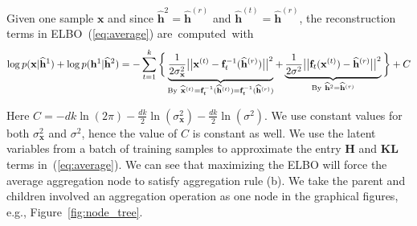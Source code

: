\documentclass{article} %
\begin{document}
Given one  sample $\mathbf{x}$ and since $\widehat{\mathbf{h}}^{2}= \widehat{\mathbf{h}}^{(r)}$ and $\widehat{\mathbf{h}}^{(t)}= \widehat{\mathbf{h}}^{(r)} $, the reconstruction terms in ELBO~(\ref{eq:average}) are~computed~with
\begin{align}\notag
\log p(\mathbf{x}|\widehat{\mathbf{h}}^1) + \log p(\mathbf{h}^1|\widehat{\mathbf{h}}^2) =-\sum_{t=1}^k\bigg\{ \underbrace{\frac{1}{2\sigma^2_{\mathbf{x}}}\big|\big| \mathbf{x}^{(t)} - \mathbf{f}_t^{-1}(\widehat{\mathbf{h}}^{(r)})\big|\big|^2 }_{\textrm{By} \  \widehat{\mathbf{x}}^{(t)}=\mathbf{f}_t^{-1}(\widehat{\mathbf{h}}^{(t)})=\mathbf{f}_t^{-1}(\widehat{\mathbf{h}}^{(r)})} +  \underbrace{\frac{1}{2\sigma^2}\big|\big|  \mathbf{f}_t(\mathbf{x}^{(t)}) - \widehat{\mathbf{h}}^{(r)}\big|\big|^2}_{\textrm{By} \  \widehat{\mathbf{h}}^{2}= \widehat{\mathbf{h}}^{(r)}} \bigg\} +C
\end{align} 

Here $C=-dk\ln(2\pi)-\frac{dk}{2}\ln(\sigma_{\mathbf{x}}^2)-\frac{dk}{2}\ln(\sigma^2)$. We use constant values for both  $\sigma^2_{\mathbf{x}}$ and $\sigma^2$, hence the value of $C$ is constant as well. We use the latent variables from a batch of training samples to approximate the entry \textbf{H} and \textbf{KL} terms in~(\ref{eq:average}). We can see that maximizing the ELBO will force the average aggregation node to satisfy aggregation rule (b). We take the parent and children involved an aggregation operation as one node in the graphical figures, e.g., Figure~\ref{fig:node_tree}. 
\end{document}
